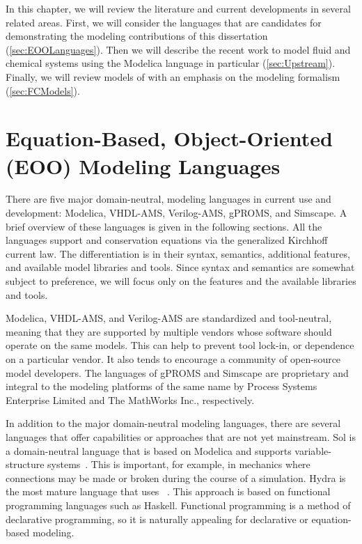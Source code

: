 \glsresetall


In this chapter, we will review the literature and current developments in several related areas.  First, we will consider the  languages that are candidates for demonstrating the modeling contributions of this dissertation (\autoref{sec:EOOLanguages}).  Then we will describe the recent work to model fluid and chemical systems using the Modelica language in particular (\autoref{sec:Upstream}). Finally, we will review models of  with an emphasis on the modeling formalism (\autoref{sec:FCModels}).


\section{Equation-Based, Object-Oriented (EOO) Modeling Languages}
\label{sec:EOOLanguages}

There are five major domain-neutral,  modeling languages in current use and development:  Modelica, VHDL-AMS, Verilog-AMS, gPROMS, and Simscape.  A brief overview of these languages is given in the following sections.  All the languages support  and conservation equations via the generalized Kirchhoff current law.  The differentiation is in their syntax, semantics, additional features, and available model libraries and tools.  Since syntax and semantics are somewhat subject to preference, we will focus only on the features and the available libraries and tools.

Modelica, VHDL-AMS, and Verilog-AMS are standardized and tool-neutral, meaning that they are supported by multiple vendors whose software should operate on the same models.  This can help to prevent tool lock-in, or dependence on a particular vendor.  It also tends to encourage a community of open-source model developers.  The languages of gPROMS and Simscape are proprietary and integral to the modeling platforms of the same name by Process Systems Enterprise Limited and The MathWorks Inc., respectively.

In addition to the major domain-neutral  modeling languages, there are several languages that offer capabilities or approaches that are not yet mainstream.  Sol is a domain-neutral  language that is based on Modelica and supports variable-structure systems~\cite{Zimmer2010}.  This is important, for example, in mechanics where connections may be made or broken during the course of a simulation.  Hydra is the most mature language that uses ~\cite{Broman2010}.  This approach is based on functional programming languages such as Haskell.  Functional programming is a method of declarative programming, so it is naturally appealing for declarative or equation-based modeling.

